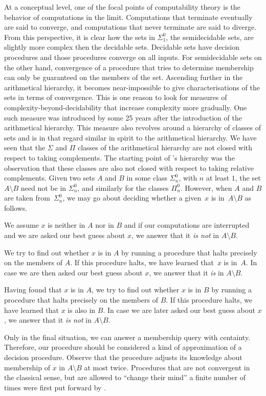 At a conceptual level, one of the focal points of computability theory is the behavior of computations in the limit.
Computations that terminate eventually are said to converge, and computations that never terminate are said to diverge.
From this perspective, it is clear how the sets in $\Sigma^0_1$, the semidecidable sets, are slightly more complex then the decidable sets.
Decidable sets have decision procedures and those procedures converge on all inputs.
For semidecidable sets on the other hand, convergence of a procedure that tries to determine membership can only be guaranteed on the members of the set.
Ascending further in the arithmetical hierarchy, it becomes near-impossible to give characterisations of the sets in terms of convergence.
This is one reason to look for measures of complexity-beyond-decidability that increase complexity more gradually.
One such measure was introduced by \textcite{ershov1968hierarchyi} some 25 years after the introduction of the arithmetical hierarchy.
This measure also revolves around a hierarchy of classes of sets and is in that regard similar in spirit to the arithmetical hierarchy.
We have seen that the $\Sigma$ and $\Pi$ classes of the arithmetical hierarchy are not closed with respect to taking complements.
The starting point of \citeauthor{ershov1968hierarchyi}'s hierarchy was the observation that these classes are also not closed with respect to taking relative complements.
Given two sets $A$ and $B$ in some class $\Sigma^0_n$, with $n$ at least $1$, the set $A \setminus B$ need not be in $\Sigma^0_n$, and similarly for the classes $\Pi^0_n$.
However, when $A$ and $B$ are taken from~$\Sigma^0_n$, we may go about deciding whether a given~$x$ is in~$A \setminus B$ as follows.
\begin{codelisting}
\item
  We assume $x$ is neither in $A$ nor in $B$ and if our computations are interrupted and we are asked our best guess about $x$, we answer that it \emph{is not} in $A \setminus B$.
\item
  We try to find out whether $x$ is in $A$ by running a procedure that halts precisely on the members of $A$.
  If this procedure halts, we have learned that~$x$ is in~$A$.
  In case we are then asked our best guess about $x$, we answer that it \emph{is} in $A \setminus B$.
\item
  Having found that $x$ is in $A$, we try to find out whether $x$ is in $B$ by running a procedure that halts precisely on the members of $B$.
  If this procedure halts, we have learned that $x$ is also in $B$.
  In case we are later asked our best guess about $x$, we answer that it \emph{is not} in $A \setminus B$.
\end{codelisting}
Only in the final situation, we can answer a membership query with centainty.
Therefore, our procedure should be considered a kind of approximation of a decision procedure.
Observe that the procedure adjusts its knowledge about membership of $x$ in $A \setminus B$ at most twice.
Procedures that are not convergent in the classical sense, but are allowed to \enquote{change their mind} a finite number of times were first put forward by \textcite{putnam1965trial,gold1965limiting}.

